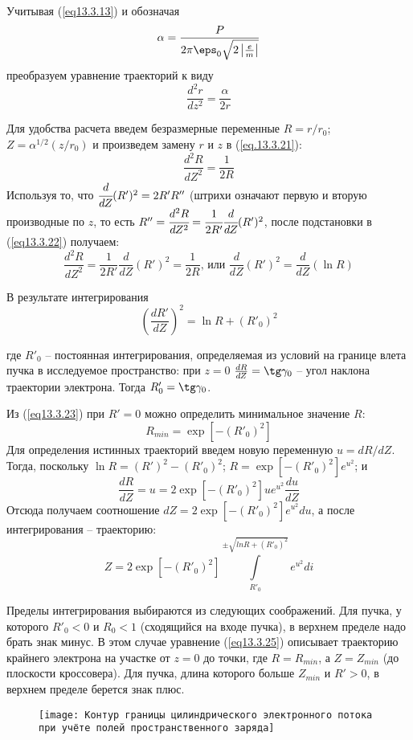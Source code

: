 Учитывая (\ref{eq13.3.13}) и обозначая 
\[
	\alpha = \frac{P}{2\pi\eps_0 \sqrt{2\left|\frac{e}{m}\right|}}
\]
преобразуем уравнение траекторий к виду
\begin{equation}
	\frac{d^2 r}{dz^2} = \frac{\alpha}{2r}
	\label{eq13.3.21}
\end{equation}
 
Для удобства расчета введем безразмерные переменные \( R = r/r_0 \); 
\( Z = \alpha^{1/2}(z/r_0) \) и произведем замену \( r \) и \( z \) в 
(\ref{eq.13.3.21}):
\begin{equation}
	\frac{d^2 R}{dZ^2} = \frac{1}{2R}
	\label{eq13.3.22}
\end{equation}
Используя то, что \( \cfrac{d}{dZ}(R')^2 = 2R'R'' \) (штрихи означают первую 
и вторую производные по \( z \), то есть 
\( R'' = \cfrac{d^2 R}{dZ^2} = \cfrac{1}{2R'}\cfrac{d}{dZ}(R')^2 \), после 
подстановки в (\ref{eq13.3.22}) получаем:
\[
	\frac{d^2 R}{dZ^2} = \frac{1}{2R'}\frac{d}{dZ}(R')^2 = \frac{1}{2R}
	\text{, или } \frac{d}{dZ}(R')^2 = \frac{d}{dZ}(\ln R)
\]

В результате интегрирования
\begin{equation}
	\left( \frac{dR'}{dZ} \right)^2 = \ln R + (R'_0)^2
	\label{eq13.3.23}
\end{equation}
 
где \( R'_0 \) -- постоянная интегрирования, определяемая из условий на 
границе влета пучка в исследуемое пространство: при \( z = 0 \) 
\( \frac{dR}{dZ} = \tg\gamma_0 \) -- угол наклона траектории электрона. Тогда 
\( R'_0 = \tg\gamma_0 \).

Из (\ref{eq13.3.23}) при \( R' = 0 \) можно определить минимальное значение 
\( R \):
\begin{equation}
	R_{min} = \exp\left[ -(R'_0)^2 \right]
	\label{eq13.3.24}
\end{equation}
Для определения истинных траекторий введем новую переменную \( u = dR/dZ \).
Тогда, поскольку \( \ln R = (R')^2 - (R'_0)^2 \); 
\( R = \exp\left[ -(R'_0)^2 \right] e^{u^2} \); и 
\[
	\frac{dR}{dZ} = u = 2 \exp\left[ -(R'_0)^2 \right] ue^{u^2} \frac{du}{dZ}
\]
Отсюда получаем соотношение 
\( dZ = 2 \exp\left[ -(R'_0)^2 \right] e^{u^2} du \), а после интегрирования -- 
траекторию:
\begin{equation}
	Z = 2\exp\left[ -(R'_0)^2 \right] 
		\int\limits_{R'_0}^{\pm\sqrt{ln R+(R'_0)^2}} e^{u^2} di
	\label{eq13.3.25}
\end{equation}

Пределы интегрирования выбираются из следующих соображений. Для пучка, у 
которого \( R'_0 < 0 \) и \( R_0 < 1 \)  (сходящийся на входе пучка), в
верхнем пределе надо брать знак минус. В этом случае уравнение 
(\ref{eq13.3.25}) описывает траекторию крайнего электрона на участке от 
\( z = 0 \) до точки, где \( R = R_{min} \), а \( Z = Z_{min} \) (до плоскости 
кроссовера). Для пучка, длина которого больше  \( Z_{min} \) и \( R' > 0 \), в 
верхнем пределе берется знак плюс.
\begin{figure}[h!]
	\center
	\texttt{[image: Контур границы цилиндрического 
		электронного потока при учёте полей пространственного заряда]}
	\caption{}
	\label{img13.1}
\end{figure}

